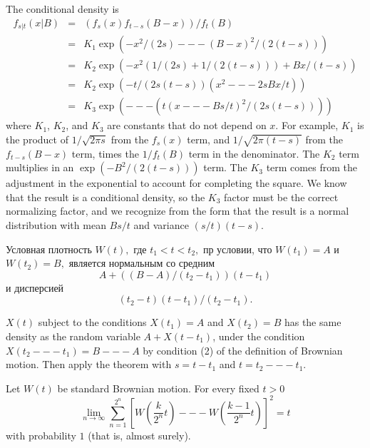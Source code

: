 \begin{solution}
\begin{solution}
\begin{solution}
\begin{solution}
\begin{solution}
\begin{solution}
\begin{solution}
\begin{solution}
\begin{solution}
\begin{solution}
{\begin{solution}
The conditional density is
\begin{eqnarray*}
  f_{s|t}(x|B) &=& ( f_s(x) f_{t-s}(B-x) )/ f_t(B) \\
  &=& K_1 \exp( -x^2/(2s) --- (B-x)^2/( 2(t-s) ) ) \\
  &=& K_2 \exp(-x^2(1/(2 s)+ 1/(2 (t-s) )) + Bx/(t-s) ) \\
  &=& K_2 \exp( -t/( 2 s (t-s) ) ( x^2 --- 2 s B x/t) ) \\
  &=& K_3 \exp( --- (t (x --- B s/t)^2/ (2 s (t-s)) ) )
\end{eqnarray*}
where $ K_1 $, $ K_2 $, and $ K_3 $ are constants that do not depend on $
x $.  For example, $ K_1 $ is the product of $ 1/\sqrt{2 \pi s} $ from
the $ f_s(x) $ term, and $ 1/\sqrt{2 \pi (t-s)} $ from the $ f_{t-s}(B-x)
$ term, times the $ 1/f_t(B) $ term in the denominator.  The $ K_2 $
term multiplies in an $ \exp(-B^2/(2 (t-s))) $ term.  The $ K_3 $ term
comes from the adjustment in the exponential to account for completing
the square.  We know that the result is a conditional density, so the $
K_3 $ factor must be the correct normalizing factor, and we recognize
from the form that the result is a normal distribution with mean $ B s/t
$ and variance $ (s/t) (t-s) $. 
\end{solution}

\begin{problem}
 Условная плотность $W(t),$ где $t_1 < t < t_2,$ пр условии, что 
  $W(t_1)=A$ и $W(t_2) = B,$ является нормальным со средним
  $$
    A + ( (B-A)/(t_2-t_1) ) (t-t_1)
  $$
  \ni и дисперсией
  $$
    (t_2-t)(t-t_1)/(t_2-t_1).
  $$

\end{problem} 
\begin{solution} 
$ X(t) $ subject to the conditions $ X(t_1) = A $ and $ X(t_2)
= B $ has the same density as the random variable $ A + X(t-t_1) $,
under the condition $ X(t_2 --- t_1) = B --- A $ by condition (2) of the
definition of Brownian motion.  Then apply the theorem with $ s = t-t_1 $
and $ t = t_2 --- t_1 $. 
\end{solution}

\begin{problem}
  \begin{theorem}
  Let $W(t)$ be standard Brownian motion.  For every fixed $t > 0$
  $$
    \lim_{n \to \infty}
    \sum_{n=1}^{2^n} 
      \left[ 
         W\left( \frac{k}{2^n} t \right) --- 
         W\left( \frac{k-1}{2^n} t \right)
      \right]^2
		= t
  $$
  \ni with probability $1$ (that is, almost surely).
  \end{theorem}


\end{problem}}
\end{solution}
\end{solution}
\end{solution}
\end{solution}
\end{solution}
\end{solution}
\end{solution}
\end{solution}
\end{solution}
\end{solution}
